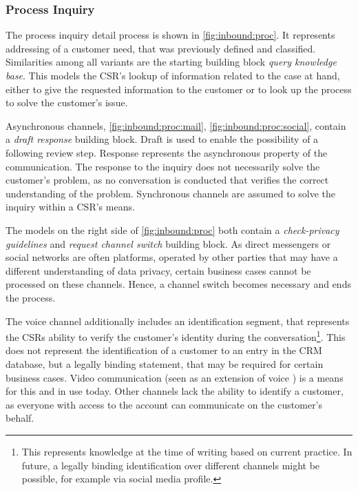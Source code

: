 	 \subsubsection{Process Inquiry}
	 
	 The process inquiry detail process is shown in \Fig \ref{fig:inbound:proc}. It represents addressing of a customer need, that was previously defined and classified. Similarities among all variants are the starting building block \textit{query knowledge base}. This models the \acrshort{CSR}'s lookup of information related to the case at hand, either to give the requested information to the customer or to look up the process to solve the customer's issue.  
	 
	 Asynchronous channels, \Fig \ref{fig:inbound:proc:mail}, \ref{fig:inbound:proc:social}, contain a \textit{draft response} building block. Draft is used to enable the possibility of a following review step. Response represents the asynchronous property of the communication. The response to the inquiry does not necessarily solve the customer's problem, as no conversation is conducted that verifies the correct understanding of the problem. Synchronous channels are assumed to solve the inquiry within a \acrshort{CSR}'s means. 
	 
	 The models on the right side of \Fig \ref{fig:inbound:proc} both contain a \textit{check-privacy guidelines} and \textit{request channel switch} building block. As direct messengers or social networks are often platforms, operated by other parties that may have a different understanding of data privacy, certain business cases cannot be processed on these channels. Hence, a channel switch becomes necessary and ends the process. 
	 
	 The voice channel additionally includes an identification segment, that represents the \acrshort{CSR}s ability to verify the customer's identity during the conversation\footnote{This represents knowledge at the time of writing based on current practice. In future, a legally binding identification over different channels might be possible, for example via social media profile.}. This does not represent the identification of a customer to an entry in the \acrshort{CRM} database, but a legally binding statement, that may be required for certain business cases. Video communication (seen as an extension of voice ) is a means for this and in use today. Other channels lack the ability to identify a customer, as everyone with access to the account can communicate on the customer's behalf. 
	 
